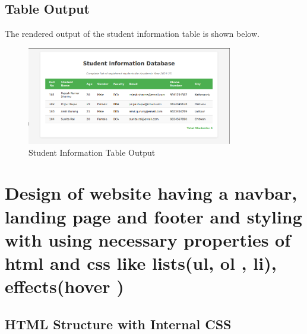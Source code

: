 \documentclass[a4paper,12pt]{article}
\begin{document}
\subsection{Table Output}
The rendered output of the student information table is shown below.

\begin{figure}[h]
    \centering
    \includegraphics[width=0.8\textwidth]{9_screenshot.png}
    \caption{Student Information Table Output}
\end{figure}

\section{Design of website having a navbar, landing page and footer and styling with using necessary properties of html and css like lists(ul, ol , li), effects(hover )}

\subsection{HTML Structure with Internal  CSS}
\end{document}
